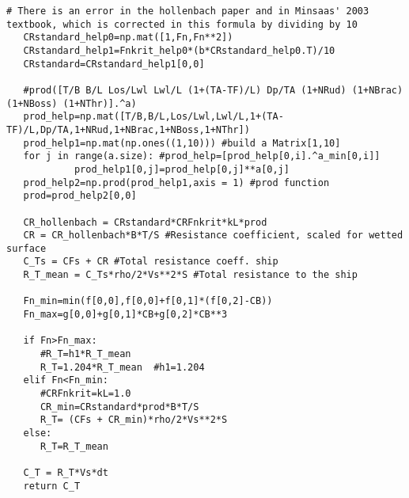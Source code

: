 \begin{lstlisting}[caption=Function for calculating cost caused by the reaction between hull and calm water(\autoref{Cost Hull}), label=calcosthull]
   # There is an error in the hollenbach paper and in Minsaas' 2003 textbook, which is corrected in this formula by dividing by 10
   CRstandard_help0=np.mat([1,Fn,Fn**2])
   CRstandard_help1=Fnkrit_help0*(b*CRstandard_help0.T)/10
   CRstandard=CRstandard_help1[0,0]

   #prod([T/B B/L Los/Lwl Lwl/L (1+(TA-TF)/L) Dp/TA (1+NRud) (1+NBrac) (1+NBoss) (1+NThr)].^a)
   prod_help=np.mat([T/B,B/L,Los/Lwl,Lwl/L,1+(TA-TF)/L,Dp/TA,1+NRud,1+NBrac,1+NBoss,1+NThr])
   prod_help1=np.mat(np.ones((1,10))) #build a Matrix[1,10]
   for j in range(a.size): #prod_help=[prod_help[0,i].^a_min[0,i]]
            prod_help1[0,j]=prod_help[0,j]**a[0,j]
   prod_help2=np.prod(prod_help1,axis = 1) #prod function
   prod=prod_help2[0,0]

   CR_hollenbach = CRstandard*CRFnkrit*kL*prod
   CR = CR_hollenbach*B*T/S #Resistance coefficient, scaled for wetted surface
   C_Ts = CFs + CR #Total resistance coeff. ship 
   R_T_mean = C_Ts*rho/2*Vs**2*S #Total resistance to the ship
   
   Fn_min=min(f[0,0],f[0,0]+f[0,1]*(f[0,2]-CB))
   Fn_max=g[0,0]+g[0,1]*CB+g[0,2]*CB**3

   if Fn>Fn_max:
      #R_T=h1*R_T_mean 
      R_T=1.204*R_T_mean  #h1=1.204
   elif Fn<Fn_min:
      #CRFnkrit=kL=1.0
      CR_min=CRstandard*prod*B*T/S
      R_T= (CFs + CR_min)*rho/2*Vs**2*S
   else:
      R_T=R_T_mean
   
   C_T = R_T*Vs*dt
   return C_T
\end{lstlisting}
